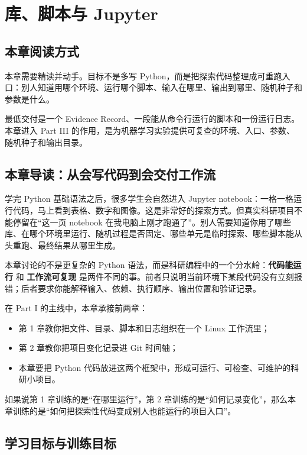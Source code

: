 \chapter{库、脚本与 Jupyter}

\section{本章阅读方式}

本章需要精读并动手。目标不是多写 Python，而是把探索代码整理成可重跑入口：别人知道用哪个环境、运行哪个脚本、输入在哪里、输出到哪里、随机种子和参数是什么。

最低交付是一个 Evidence Record、一段能从命令行运行的脚本和一份运行日志。本章进入 Part III 的作用，是为机器学习实验提供可复查的环境、入口、参数、随机种子和输出目录。

\section{本章导读：从会写代码到会交付工作流}

学完 Python 基础语法之后，很多学生会自然进入 Jupyter notebook：一格一格运行代码，马上看到表格、数字和图像。这是非常好的探索方式。但真实科研项目不能停留在“这一页 notebook 在我电脑上刚才跑通了”。别人需要知道你用了哪些库、在哪个环境里运行、随机过程是否固定、哪些单元是临时探索、哪些脚本能从头重跑、最终结果从哪里生成。

本章讨论的不是更复杂的 Python 语法，而是科研编程中的一个分水岭：\textbf{代码能运行} 和 \textbf{工作流可复现} 是两件不同的事。前者只说明当前环境下某段代码没有立刻报错；后者要求你能解释输入、依赖、执行顺序、输出位置和验证记录。

在 Part I 的主线中，本章承接前两章：

\begin{itemize}
    \item 第 1 章教你把文件、目录、脚本和日志组织在一个 Linux 工作流里；
    \item 第 2 章教你把项目变化记录进 Git 时间轴；
    \item 本章要把 Python 代码放进这两个框架中，形成可运行、可检查、可维护的科研小项目。
\end{itemize}

如果说第 1 章训练的是“在哪里运行”，第 2 章训练的是“如何记录变化”，那么本章训练的是“如何把探索性代码变成别人也能运行的项目入口”。

\section{学习目标与训练目标}

